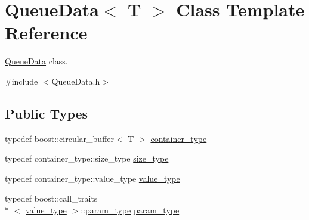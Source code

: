 \hypertarget{class_queue_data}{\section{Queue\+Data$<$ T $>$ Class Template Reference}
\label{class_queue_data}
}


\hyperlink{class_queue_data}{Queue\+Data} class.  




{\ttfamily \#include $<$Queue\+Data.\+h$>$}

\subsection*{Public Types}
\begin{DoxyCompactItemize}
\item 
typedef boost\+::circular\+\_\+buffer$<$ T $>$ \hyperlink{class_queue_data_a9b55a0b5873807c9c192df08859cb459}{container\+\_\+type}
\item 
typedef container\+\_\+type\+::size\+\_\+type \hyperlink{class_queue_data_a91e3b70427c70371043664724c62f6ce}{size\+\_\+type}
\item 
typedef container\+\_\+type\+::value\+\_\+type \hyperlink{class_queue_data_a9870b0080932714fd92fd92595687130}{value\+\_\+type}
\item 
typedef boost\+::call\+\_\+traits\\*
$<$ \hyperlink{class_queue_data_a9870b0080932714fd92fd92595687130}{value\+\_\+type} $>$\+::\hyperlink{class_queue_data_a15ff80c62590d5e134ef147ccab7b0e6}{param\+\_\+type} \hyperlink{class_queue_data_a15ff80c62590d5e134ef147ccab7b0e6}{param\+\_\+type}
\end{DoxyCompactItemize}
